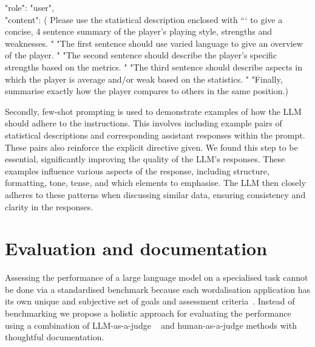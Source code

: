 \documentclass{article}
\begin{document}
\begin{tcolorbox}[colback=white, colframe=black, rounded corners]
"role": "user",\\
"content": ( Please use the statistical description enclosed with ``` to give a concise, 4 sentence summary of the player's playing style, strengths and weaknesses. "
"The first sentence should use varied language to give an overview of the player. "
"The second sentence should describe the player's specific strengths based on the metrics. "
"The third sentence should describe aspects in which the player is average and/or weak based on the statistics. "
"Finally, summarise exactly how the player compares to others in the same position.) 
\end{tcolorbox}



Secondly, few-shot prompting is used to demonstrate examples of how the LLM should adhere to the instructions. This involves including example pairs of statistical descriptions and corresponding assistant responses within the prompt. These pairs also reinforce the explicit directive given. We found this step to be essential, significantly improving the quality of the LLM's responses. These examples influence various aspects of the response, including structure, formatting, tone, tense, and which elements to emphasise. The LLM then closely adheres to these patterns when discussing similar data, ensuring consistency and clarity in the responses. 

\section{Evaluation and documentation} \label{sec:evaluation}
Assessing the performance of a large language model on a specialised task cannot be done via a standardised benchmark because each wordalisation application has its own unique and subjective set of goals and assessment criteria~\cite{raji2021ai, kaddour2023challengesapplicationslargelanguage, vendrow2024large}. Instead of benchmarking we propose a holistic approach for evaluating the performance using a combination of LLM-as-a-judge ~\cite{gu2024survey,li2024generation} and human-as-a-judge  methods with thoughtful documentation. 
\end{document}
